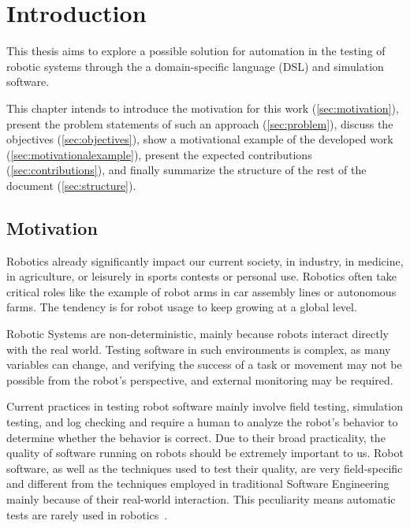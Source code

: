 \chapter{Introduction}
\label{chap:introduction}

This thesis aims to explore a possible solution for automation in the testing of robotic systems through the a domain-specific language (DSL) and simulation software.

This chapter intends to introduce the motivation for this work (\autoref{sec:motivation}), present the problem statements of such an approach (\autoref{sec:problem}), discuss the objectives (\autoref{sec:objectives}), show a motivational example of the developed work (\autoref{sec:motivationalexample}), present the expected contributions (\autoref{sec:contributions}), and finally summarize the structure of the rest of the document (\autoref{sec:structure}).


\section{Motivation}
\label{sec:motivation}

Robotics already significantly impact our current society, in industry, in medicine, in agriculture, or leisurely in sports contests or personal use. Robotics often take critical roles like the example of robot arms in car assembly lines or autonomous farms. The tendency is for robot usage to keep growing at a global level. 

Robotic Systems are non-deterministic, mainly because robots interact directly with the real world. Testing software in such environments is complex, as many variables can change, and verifying the success of a task or movement may not be possible from the robot's perspective, and external monitoring may be required.

Current practices in testing robot software mainly involve field testing, simulation testing, and log checking and require a human to analyze the robot's behavior to determine whether the behavior is correct. Due to their broad practicality, the quality of software running on robots should be extremely important to us. Robot software, as well as the techniques used to test their quality, are very field-specific and different from the techniques employed in traditional Software Engineering mainly because of their real-world interaction. This peculiarity means automatic tests are rarely used in robotics~\cite{9240632,zizyte2021importance}.

